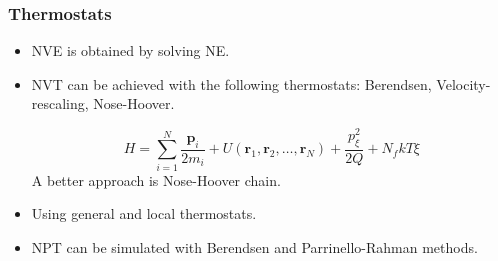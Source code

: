 \documentclass{beamer}
\begin{document}
\begin{frame}\frametitle{Thermostats}

\begin{itemize}
	\item NVE is obtained by solving NE.
	\item NVT can be achieved with the following thermostats: Berendsen, Velocity-rescaling,
		Nose-Hoover.

\begin{equation}
	H= \sum_{i=1}^{N} \frac{\mathbf{p}_i}{2m_i} + U(\mathbf{r}_1,\mathbf{r}_2,\ldots, \mathbf{r}_N) + \frac{p_{\xi}^2}{2Q} 
	+ N_f kT\xi
\end{equation}
 A better approach is Nose-Hoover chain.

	\item  Using general and local thermostats. 

	\item NPT can be simulated with Berendsen and Parrinello-Rahman methods.
\end{itemize}

\end{frame}
\end{document}
